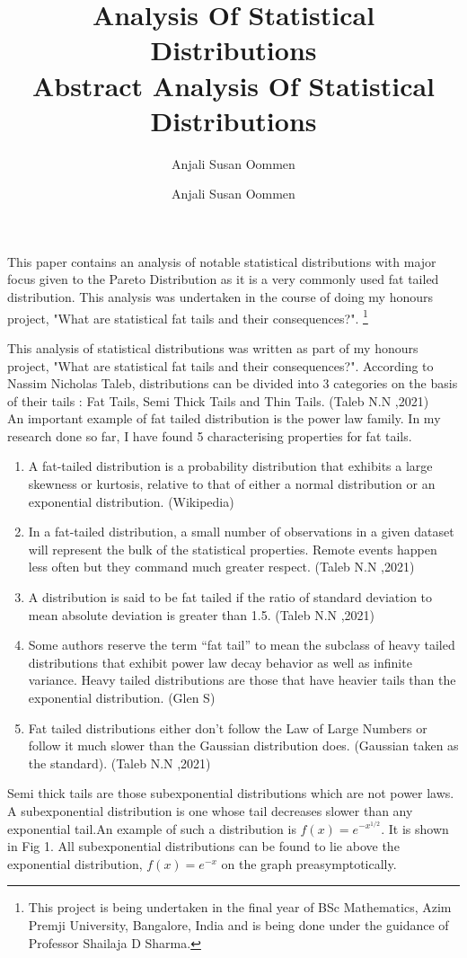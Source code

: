 \documentclass[14pt, a4paper]{article}
\title{Analysis Of Statistical Distributions \\ Abstract }
\author{Anjali Susan Oommen}
\date{}
\theoremstyle{definition}
\begin{document}
\maketitle
 

This paper contains an analysis of notable statistical distributions with major focus given to the Pareto Distribution as it is a very commonly used fat tailed distribution. This analysis was undertaken in the course of doing my honours project, "What are statistical fat tails and their consequences?".  \footnote{This project is being undertaken in the final year of BSc Mathematics, Azim Premji University, Bangalore, India and is being done under the guidance of Professor Shailaja D Sharma. } 

\newpage
\title{Analysis Of Statistical Distributions}
\author{Anjali Susan Oommen}
\date{}
\maketitle

This analysis of statistical distributions was written as part of my honours project, "What are statistical fat tails and their consequences?". According to Nassim Nicholas Taleb, distributions can be divided into $3$ categories on the basis of their tails : Fat Tails, Semi Thick Tails and Thin Tails. (Taleb N.N ,2021)
\\ An important example of fat tailed distribution is the power law family. In my research done so far, I have found 5 characterising properties for fat tails.
\begin{enumerate}
\item A fat-tailed distribution is a probability distribution that exhibits a large skewness or kurtosis, relative to that of either a normal distribution or an exponential distribution. (Wikipedia)
\item In a fat-tailed distribution, a small number of observations in a given dataset will represent the bulk of the statistical properties. Remote events happen less often but they command much greater respect. (Taleb N.N ,2021)
\item A distribution is said to be fat tailed if the ratio of standard deviation to mean absolute deviation is greater than 1.5. (Taleb N.N ,2021)
\item Some authors reserve the term “fat tail” to mean the subclass of heavy tailed distributions that exhibit power law decay behavior as well as infinite variance. Heavy tailed distributions are those that have heavier tails than the exponential distribution. (Glen S)
\item Fat tailed distributions either don’t follow the Law of Large Numbers or follow it much slower than the Gaussian distribution does. (Gaussian taken as the standard). (Taleb N.N ,2021)
\end{enumerate}
Semi thick tails are those subexponential distributions which are not power laws. A subexponential distribution is one whose tail decreases slower than any exponential tail.An example of such a distribution is $f(x) = e^{-x^{1/2}}$. It is shown in Fig 1. All subexponential distributions can be found to lie above the exponential distribution, $f(x) = e^{-x}$ on the graph preasymptotically.
\end{document}
